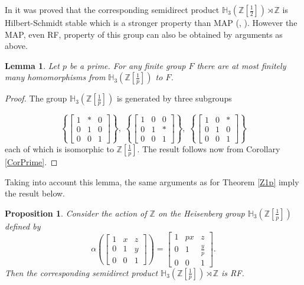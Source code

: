 \documentclass[11 pt, leqno, hidelinks]{amsart}%
\theoremstyle{plain}
\newtheorem{lemma}[theorem]{Lemma}
\newtheorem{proposition}[theorem]{Proposition}
\numberwithin{equation}{section}
\begin{document}
In \cite[Th. 5.23]{ES} it was proved that the corresponding semidirect product $\mathbb H_3\left(\mathbb Z[\frac{1}{2}]\right)\rtimes \mathbb Z$ is Hilbert-Schmidt stable which is a stronger property than MAP (\cite[Theorem 3 + Proposition 3]{HS}, \cite[page 2]{ES}). However the MAP, even RF,  property of this group can also be obtained by arguments  as above.

\begin{lemma}   Let $p$ be a prime.  For any finite group $F$ there are at most finitely many homomorphisms from $\mathbb H_3\left(\mathbb Z[\frac{1}{p}]\right)$ to $F$.
\end{lemma}
\begin{proof} The group $\mathbb H_3\left(\mathbb Z[\frac{1}{p}]\right)$ is generated by three subgroups

$$\left\{ \left[ \begin{array}{ccc} 1 & \ast & 0 \\ 0 & 1 & 0\\ 0 & 0 & 1 \end{array}  \right]\right\}, \; \left\{ \left[ \begin{array}{ccc} 1 & 0 & 0 \\ 0 & 1 & \ast\\ 0 & 0 & 1 \end{array}  \right]\right\}, \; \left\{ \left[ \begin{array}{ccc} 1 & 0 & \ast \\ 0 & 1 & 0\\ 0 & 0 & 1 \end{array}  \right]\right\} $$
each of which is isomorphic to $\mathbb Z[\frac{1}{p}]$. The result follows now from Corollary \ref{CorPrime}.


\end{proof}

\noindent Taking into account this lemma, the same arguments as  for Theorem \ref{Z1p} imply the result below.

\begin{proposition} Consider the action of $\mathbb Z$ on  the Heisenberg group $\mathbb H_3\left(\mathbb Z[\frac{1}{p}]\right)$ defined by
\begin{equation*}
\alpha\left( \left[ \begin{array}{ccc} 1 & x & z\\ 0 & 1 & y\\ 0 & 0 & 1 \end{array}  \right]  \right)=\left[ \begin{array}{ccc} 1 & px & z\\ 0 & 1 & \frac{y}{p}\\ 0 & 0 & 1 \end{array}  \right].
\end{equation*}
 Then the corresponding semidirect product $\mathbb H_3\left(\mathbb Z[\frac{1}{p}]\right) \rtimes \mathbb Z$ is RF.
\end{proposition}
\end{document}
